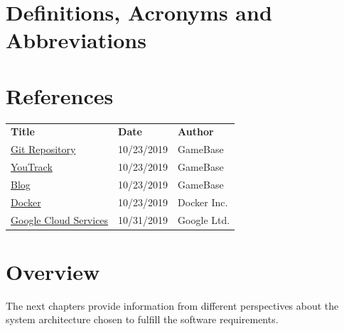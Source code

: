 \documentclass[a4paper,12pt,chapterprefix=false,bibliography=totoc,listof=totoc,]{scrreprt}
\begin{document}
\section{Definitions, Acronyms and Abbreviations}
\printabbreviations[title={}]

\section{References}
\begin{table}[H]
	\centering
	\everyrow{\hline}
	\begin{tabu} to \textwidth {|X[c]|X[c]|X[c]|}
		\textbf{Title} & \textbf{Date} & \textbf{Author} \\
		\href{https://gitlab.tandashi.de/GameBase}{Git Repository} & 10/23/2019 & GameBase \\
		\href{https://youtrack.gahr.dev}{YouTrack} & 10/23/2019 & GameBase \\
		\href{https://gahr.dev}{Blog} & 10/23/2019 & GameBase \\
		\href{https://www.docker.com/}{Docker} & 10/23/2019 & Docker Inc. \\
		\href{https://cloud.google.com/}{Google Cloud Services} & 10/31/2019 & Google Ltd. \\
	\end{tabu}
	\label{tab:references-tabview}
\end{table}

\section{Overview}
The next chapters provide information from different perspectives about the system architecture chosen to fulfill the software requirements.
\end{document}

